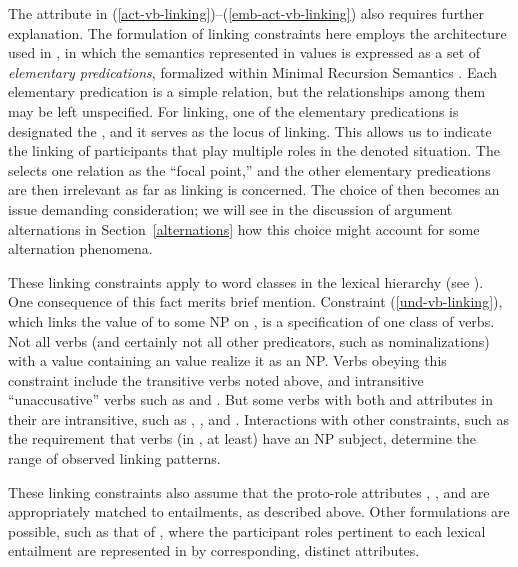 \documentclass[output=paper
 	        ,biblatex
                ,babelshorthands
                ,newtxmath
                ,draftmode
                ,colorlinks, citecolor=brown
]{langscibook}
\begin{document}
The  attribute in (\ref{act-vb-linking})--(\ref{emb-act-vb-linking}) also requires further
explanation. The formulation of linking constraints here employs the architecture used
in \citet{KoenigandDavis2006}, in which the semantics represented in \content values is expressed as
a set of \emph{elementary predications}, formalized within Minimal Recursion Semantics
\citep{Copestakeetal2001,Copestakeetal2005}.  Each elementary predication is a simple relation, but
the relationships among them may be left unspecified.  For linking, one of the elementary
predications is designated the , and it serves as the locus of linking.  This allows us to
indicate the linking of participants that play multiple roles in the denoted situation. 
The  selects one relation as the ``focal point,'' and the other elementary predications
are then irrelevant as far as linking is concerned. The choice of  then becomes an issue
demanding consideration; we will see in the discussion of argument alternations in
Section~\ref{alternations} how this choice might account for some alternation phenomena. 

These linking constraints apply to word classes in the lexical hierarchy (see
).  One consequence of this fact merits brief mention.  Constraint
(\ref{und-vb-linking}), which links the value of  to some NP on \argst, is a specification
of one class of verbs.  Not all verbs (and certainly not all other predicators, such as
nominalizations) with a \content value containing an  value realize it as an NP.  Verbs
obeying this constraint include the transitive verbs noted above, and intransitive ``unaccusative''
verbs such as  and .  But some verbs with both  and 
attributes in their \content are intransitive, such as , , and
.  Interactions with other constraints, such as the requirement that verbs (in
, at least) have an NP subject, determine the range of observed linking patterns.

These linking constraints also assume that the proto-role attributes , , and  are
appropriately matched to entailments, as described above.  Other formulations are possible, such as
that of \citet{KoenigandDavis2003}, where the participant roles pertinent to each lexical entailment are represented in
\content by corresponding, distinct attributes.
\end{document}
